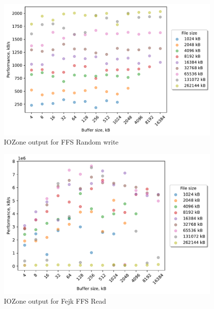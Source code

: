 \begin{figure}[!htb]
	\label{fig:bench_ffs_rnd_write}
	\begin{center}
		\includegraphics[width=1.0\textwidth]{figures.nosync/benchmarking/ffs/Random write.pdf}
	\end{center}
	\caption{IOZone output for FFS Random write}
\end{figure}

\begin{figure}[!htb]
	\label{fig:bench_fffs_read}
	\begin{center}
		\includegraphics[width=1.0\textwidth]{figures.nosync/benchmarking/fejk-ffs/Read.pdf}
	\end{center}
	\caption{IOZone output for Fejk FFS Read}
\end{figure}

